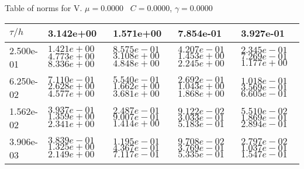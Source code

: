 \begin{center}
Table of norms for V. $\mu = 0.0000$ \, $C = 0.0000$, $\gamma = 0.0000$
  
\begin{tabular}{|p{1in}|p{1in}|p{1in}|p{1in}|p{1in}|} \hline
$\tau / h$ &3.142e+00 &1.571e+00 &7.854e-01 &3.927e-01 \\ \hline 
2.500e-01 & $1.421e+00$  $4.773e+00$  $8.336e+00$  & $8.575e-01$  $3.108e+00$  $4.848e+00$  & $4.207e-01$  $1.453e+00$  $2.245e+00$  & $2.345e-01$  $7.269e-01$  $1.177e+00$  \\ \hline 
6.250e-02 & $7.110e-01$  $2.628e+00$  $4.577e+00$  & $5.540e-01$  $1.662e+00$  $3.681e+00$  & $2.692e-01$  $1.043e+00$  $1.868e+00$  & $1.018e-01$  $3.569e-01$  $6.605e-01$  \\ \hline 
1.562e-02 & $3.937e-01$  $1.359e+00$  $2.341e+00$  & $2.487e-01$  $9.007e-01$  $1.414e+00$  & $9.122e-02$  $3.033e-01$  $5.183e-01$  & $5.510e-02$  $1.869e-01$  $2.894e-01$  \\ \hline 
3.906e-03 & $3.839e-01$  $1.325e+00$  $2.149e+00$  & $1.195e-01$  $4.367e-01$  $7.117e-01$  & $9.708e-02$  $3.769e-01$  $5.335e-01$  & $2.797e-02$  $1.037e-01$  $1.547e-01$  \\ \hline 

\end{tabular}\\[20pt]
\end{center}
